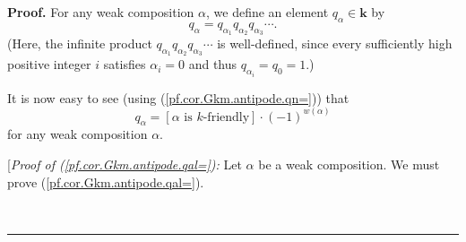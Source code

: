 \documentclass[numbers=enddot,12pt,final,onecolumn,notitlepage]{scrartcl}%
\theoremstyle{definition}
\newenvironment{proof}[1][Proof]{\noindent\textbf{#1.} }{\ \rule{0.5em}{0.5em}}
\newenvironment{verlong}{}{}
\begin{document}
\begin{proof}
For any weak composition $\alpha$, we define an element $q_{\alpha}%
\in\mathbf{k}$ by%
\[
q_{\alpha}=q_{\alpha_{1}}q_{\alpha_{2}}q_{\alpha_{3}}\cdots.
\]
(Here, the infinite product $q_{\alpha_{1}}q_{\alpha_{2}}q_{\alpha_{3}}\cdots$
is well-defined, since every sufficiently high positive integer $i$ satisfies
$\alpha_{i}=0$ and thus $q_{\alpha_{i}}=q_{0}=1$.)

It is now easy to see (using (\ref{pf.cor.Gkm.antipode.qn=})) that%
\begin{equation}
q_{\alpha}=\left[  \alpha\text{ is }k\text{-friendly}\right]  \cdot\left(
-1\right)  ^{w\left(  \alpha\right)  } \label{pf.cor.Gkm.antipode.qal=}%
\end{equation}
for any weak composition $\alpha$.

\begin{verlong}
[\textit{Proof of (\ref{pf.cor.Gkm.antipode.qal=}):} Let $\alpha$ be a weak
composition. We must prove (\ref{pf.cor.Gkm.antipode.qal=}).


\end{verlong}
\end{proof}
\end{document}
